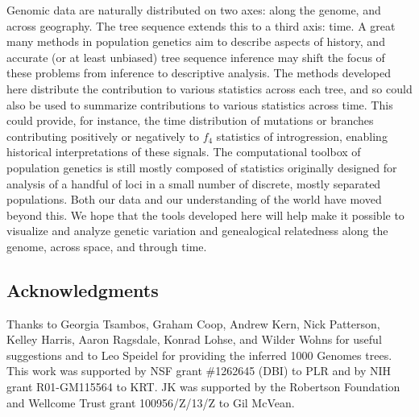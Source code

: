 \documentclass[9pt,twoside,lineno]{gsajnl}
\begin{document}
Genomic data are naturally distributed on two axes: along the genome, and across geography.
The tree sequence extends this to a third axis: time.
A great many methods in population genetics aim to describe aspects of history,
and accurate (or at least unbiased) tree sequence inference
may shift the focus of these problems from inference to descriptive analysis.
The methods developed here distribute the contribution to various statistics across each tree,
and so could also be used to summarize contributions to various statistics across time.
This could provide, for instance, the time distribution of mutations or branches
contributing positively or negatively to $f_4$ statistics of introgression,
enabling historical interpretations of these signals.
The computational toolbox of population genetics
is still mostly composed of statistics originally designed for analysis of a handful of loci
in a small number of discrete, mostly separated populations.
Both our data and our understanding of the world have moved beyond this.
We hope that the tools developed here will help make it possible
to visualize and analyze genetic variation and genealogical relatedness
along the genome, across space, and through time.






\subsection*{Acknowledgments}
Thanks to Georgia Tsambos, Graham Coop, Andrew Kern, Nick Patterson, Kelley Harris,
Aaron Ragsdale, Konrad Lohse, and Wilder Wohns for useful suggestions
and to Leo Speidel for providing the inferred 1000 Genomes trees.
This work was supported by NSF grant \#1262645 (DBI) to PLR
and by NIH grant R01-GM115564 to KRT. JK was supported by
the Robertson Foundation and Wellcome Trust grant 100956/Z/13/Z
to Gil McVean.
\end{document}
